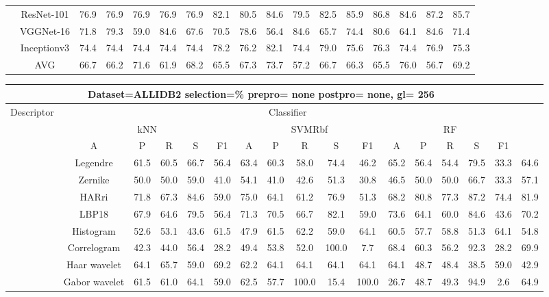 \documentclass[12pt,italian]{article}
\begin{document}
\begin{tiny}
\begin{longtable}{lcccccccccccccccc}
& ResNet-101 & 76.9 & 76.9 & 76.9 & 76.9 & 76.9 & 82.1 & 80.5 & 84.6 & 79.5 & 82.5 & 85.9 & 86.8 & 84.6 & 87.2 & 85.7 \\ 
& VGGNet-16 & 71.8 & 79.3 & 59.0 & 84.6 & 67.6 & 70.5 & 78.6 & 56.4 & 84.6 & 65.7 & 74.4 & 80.6 & 64.1 & 84.6 & 71.4 \\ 
& Inceptionv3 & 74.4 & 74.4 & 74.4 & 74.4 & 74.4 & 78.2 & 76.2 & 82.1 & 74.4 & 79.0 & 75.6 & 76.3 & 74.4 & 76.9 & 75.3 \\ 
\hline
& AVG & 66.7 & 66.2 & 71.6 & 61.9 & 68.2 & 65.5 & 67.3 & 73.7 & 57.2 & 66.7 & 66.3 & 65.5 & 76.0 & 56.7 & 69.2 \\ 
\hline
\bottomrule
\end{longtable} 

 \pagebreak 
\begin{longtable}{lcccccccccccccccc}
\toprule
\multicolumn{16}{c}{Dataset=ALLIDB2 selection=\% prepro= none postpro= none, gl= 256} \\ 
\toprule
Descriptor & \multicolumn{15}{c}{Classifier} \\ 
& \multicolumn{5}{c}{kNN} & \multicolumn{5}{c}{SVMRbf} & \multicolumn{5}{c}{RF} \\ 
& A & P & R & S & F1 & A & P & R & S & F1 & A & P & R & S & F1 \\ 
\midrule
& Legendre & 61.5 & 60.5 & 66.7 & 56.4 & 63.4 & 60.3 & 58.0 & 74.4 & 46.2 & 65.2 & 56.4 & 54.4 & 79.5 & 33.3 & 64.6 \\ 
& Zernike & 50.0 & 50.0 & 59.0 & 41.0 & 54.1 & 41.0 & 42.6 & 51.3 & 30.8 & 46.5 & 50.0 & 50.0 & 66.7 & 33.3 & 57.1 \\ 
& HARri & 71.8 & 67.3 & 84.6 & 59.0 & 75.0 & 64.1 & 61.2 & 76.9 & 51.3 & 68.2 & 80.8 & 77.3 & 87.2 & 74.4 & 81.9 \\ 
& LBP18 & 67.9 & 64.6 & 79.5 & 56.4 & 71.3 & 70.5 & 66.7 & 82.1 & 59.0 & 73.6 & 64.1 & 60.0 & 84.6 & 43.6 & 70.2 \\ 
& Histogram & 52.6 & 53.1 & 43.6 & 61.5 & 47.9 & 61.5 & 62.2 & 59.0 & 64.1 & 60.5 & 57.7 & 58.8 & 51.3 & 64.1 & 54.8 \\ 
& Correlogram & 42.3 & 44.0 & 56.4 & 28.2 & 49.4 & 53.8 & 52.0 & 100.0 &  7.7 & 68.4 & 60.3 & 56.2 & 92.3 & 28.2 & 69.9 \\ 
& Haar wavelet & 64.1 & 65.7 & 59.0 & 69.2 & 62.2 & 64.1 & 64.1 & 64.1 & 64.1 & 64.1 & 48.7 & 48.4 & 38.5 & 59.0 & 42.9 \\ 
& Gabor wavelet & 61.5 & 61.0 & 64.1 & 59.0 & 62.5 & 57.7 & 100.0 & 15.4 & 100.0 & 26.7 & 48.7 & 49.3 & 94.9 &  2.6 & 64.9 \\ 

\end{longtable}
\end{tiny}
\end{document}
